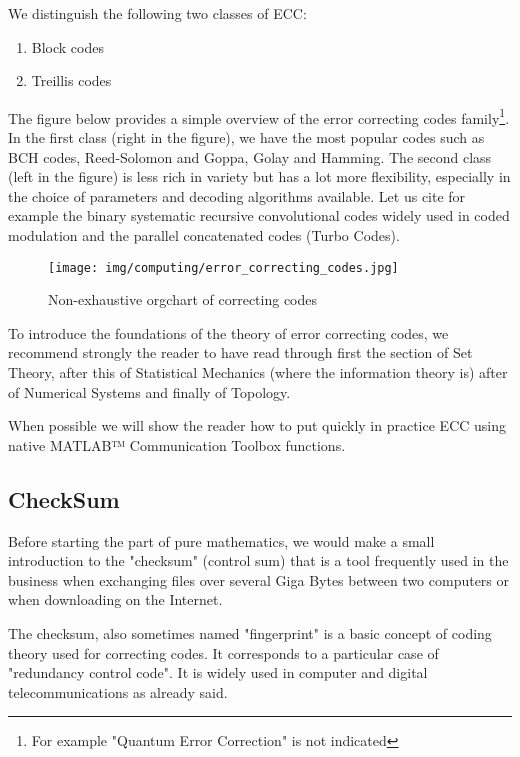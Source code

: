 	We distinguish the following two classes of ECC: 
	\begin{enumerate}
		\item Block codes
		\item Treillis codes
	\end{enumerate}
	The figure below provides a simple overview of the error correcting codes family\footnote{For example "Quantum Error Correction" is not indicated}. In the first class (right in the figure), we have the most popular codes such as BCH codes, Reed-Solomon and Goppa, Golay and Hamming. The second class (left in the figure) is less rich in variety but has a lot more flexibility, especially in the choice of parameters and decoding algorithms available. Let us cite for example the binary systematic recursive convolutional codes widely used in coded modulation and the parallel concatenated codes (Turbo Codes).
	\begin{figure}[H]
		\centering
		\texttt{[image: img/computing/error\_correcting\_codes.jpg]}
		\caption{Non-exhaustive orgchart of correcting codes}
	\end{figure}
	\begin{tcolorbox}[title=Remark,colframe=black,arc=10pt]
	To introduce the foundations of the theory of error correcting codes, we recommend strongly the reader to have read through first the section of Set Theory, after this of  Statistical Mechanics (where the information theory is) after of Numerical Systems and finally of Topology.
	\end{tcolorbox}
	
	When possible we will show the reader how to put quickly in practice ECC using native MATLAB™ Communication Toolbox functions.
	
	\subsection{CheckSum}\label{checksum}
	Before starting the part of pure mathematics, we would make a small introduction to the "checksum" (control sum) that is a tool frequently used in the business when exchanging files over several Giga Bytes between two computers or when downloading on the Internet.
	
	The checksum, also sometimes named "fingerprint" is a basic concept of coding theory used for correcting codes. It corresponds to a particular case of "redundancy control code". It is widely used in computer and digital telecommunications as already said.
	
